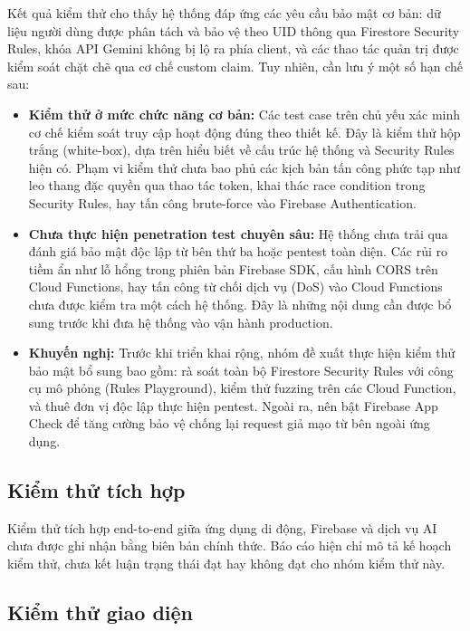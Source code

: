 Kết quả kiểm thử cho thấy hệ thống đáp ứng các yêu cầu bảo mật cơ bản: dữ liệu người dùng được phân tách và bảo vệ theo UID thông qua Firestore Security Rules, khóa API Gemini không bị lộ ra phía client, và các thao tác quản trị được kiểm soát chặt chẽ qua cơ chế custom claim. Tuy nhiên, cần lưu ý một số hạn chế sau:

\begin{itemize}
    \item \textbf{Kiểm thử ở mức chức năng cơ bản:} Các test case trên chủ yếu xác minh cơ chế kiểm soát truy cập hoạt động đúng theo thiết kế. Đây là kiểm thử hộp trắng (white-box), dựa trên hiểu biết về cấu trúc hệ thống và Security Rules hiện có. Phạm vi kiểm thử chưa bao phủ các kịch bản tấn công phức tạp như leo thang đặc quyền qua thao tác token, khai thác race condition trong Security Rules, hay tấn công brute-force vào Firebase Authentication.

    \item \textbf{Chưa thực hiện penetration test chuyên sâu:} Hệ thống chưa trải qua đánh giá bảo mật độc lập từ bên thứ ba hoặc pentest toàn diện. Các rủi ro tiềm ẩn như lỗ hổng trong phiên bản Firebase SDK, cấu hình CORS trên Cloud Functions, hay tấn công từ chối dịch vụ (DoS) vào Cloud Functions chưa được kiểm tra một cách hệ thống. Đây là những nội dung cần được bổ sung trước khi đưa hệ thống vào vận hành production.

    \item \textbf{Khuyến nghị:} Trước khi triển khai rộng, nhóm đề xuất thực hiện kiểm thử bảo mật bổ sung bao gồm: rà soát toàn bộ Firestore Security Rules với công cụ mô phỏng (Rules Playground), kiểm thử fuzzing trên các Cloud Function, và thuê đơn vị độc lập thực hiện pentest. Ngoài ra, nên bật Firebase App Check để tăng cường bảo vệ chống lại request giả mạo từ bên ngoài ứng dụng.
\end{itemize}

\subsection{Kiểm thử tích hợp}

Kiểm thử tích hợp end-to-end giữa ứng dụng di động, Firebase và dịch vụ AI chưa được ghi nhận bằng biên bản chính thức. Báo cáo hiện chỉ mô tả kế hoạch kiểm thử, chưa kết luận trạng thái đạt hay không đạt cho nhóm kiểm thử này.

\subsection{Kiểm thử giao diện}

